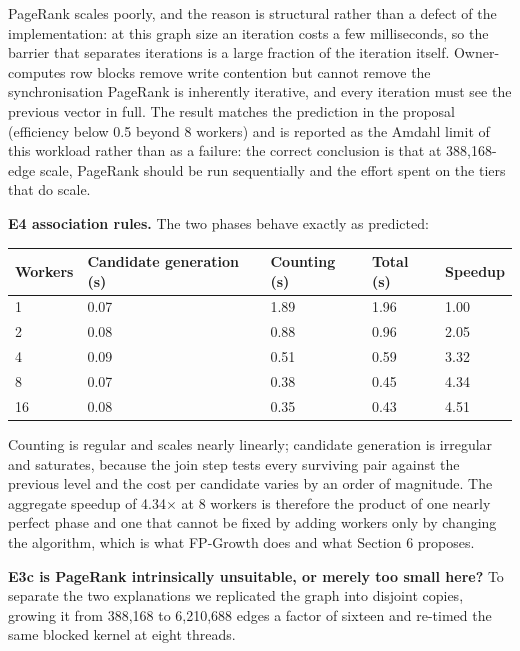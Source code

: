 PageRank scales poorly, and the reason is structural rather than a defect of the implementation: at this graph size an iteration costs a few milliseconds, so the barrier that separates iterations is a large fraction of the iteration itself. Owner-computes row blocks remove write contention but cannot remove the synchronisation \textemdash{} PageRank is inherently iterative, and every iteration must see the previous vector in full. The result matches the prediction in the proposal (efficiency below 0.5 beyond 8 workers) and is reported as the Amdahl limit of this workload rather than as a failure: the correct conclusion is that at 388,168-edge scale, PageRank should be run sequentially and the effort spent on the tiers that do scale.

\textbf{E4 \textemdash{} association rules.} The two phases behave exactly as predicted:

\begin{table}[H]
\centering
\footnotesize
\begin{tabularx}{\textwidth}{lXXXX}
\toprule
Workers & Candidate generation (s) & Counting (s) & Total (s) & Speedup \\
\midrule
1 & 0.07 & 1.89 & 1.96 & 1.00 \\
2 & 0.08 & 0.88 & 0.96 & 2.05 \\
4 & 0.09 & 0.51 & 0.59 & 3.32 \\
8 & 0.07 & 0.38 & 0.45 & 4.34 \\
16 & 0.08 & 0.35 & 0.43 & 4.51 \\
\bottomrule
\end{tabularx}
\end{table}

Counting is regular and scales nearly linearly; candidate generation is irregular and saturates, because the join step tests every surviving pair against the previous level and the cost per candidate varies by an order of magnitude. The aggregate speedup of 4.34$\times$ at 8 workers is therefore the product of one nearly perfect phase and one that cannot be fixed by adding workers \textemdash{} only by changing the algorithm, which is what FP-Growth does and what Section 6 proposes.

\textbf{E3c \textemdash{} is PageRank intrinsically unsuitable, or merely too small here?} To separate the two explanations we replicated the graph into disjoint copies, growing it from 388,168 to 6,210,688 edges \textemdash{} a factor of sixteen \textemdash{} and re-timed the same blocked kernel at eight threads.

